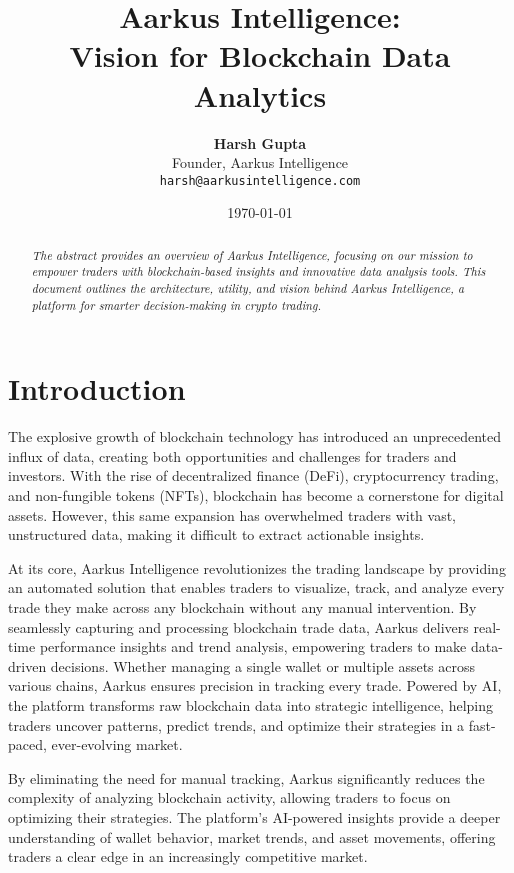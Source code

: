 \documentclass{article}
\title{\Huge \textbf{Aarkus Intelligence: \\ Vision for Blockchain Data Analytics}}
\author{
  \textbf{Harsh Gupta} \\
  Founder, Aarkus Intelligence \\
  \texttt{harsh@aarkusintelligence.com}
}
\date{\today}
\begin{document}
\maketitle
\thispagestyle{empty} %

\begin{abstract}
\textit{
The abstract provides an overview of Aarkus Intelligence, focusing on our mission to empower traders with blockchain-based insights and innovative data analysis tools. This document outlines the architecture, utility, and vision behind Aarkus Intelligence, a platform for smarter decision-making in crypto trading.
}
\end{abstract}

\tableofcontents

\newpage
\section{Introduction}
The explosive growth of blockchain technology has introduced an unprecedented influx of data, creating both opportunities and challenges for traders and investors. With the rise of decentralized finance (DeFi), cryptocurrency trading, and non-fungible tokens (NFTs), blockchain has become a cornerstone for digital assets. However, this same expansion has overwhelmed traders with vast, unstructured data, making it difficult to extract actionable insights.

At its core, Aarkus Intelligence revolutionizes the trading landscape by providing an automated solution that enables traders to visualize, track, and analyze every trade they make across any blockchain without any manual intervention. By seamlessly capturing and processing blockchain trade data, Aarkus delivers real-time performance insights and trend analysis, empowering traders to make data-driven decisions. Whether managing a single wallet or multiple assets across various chains, Aarkus ensures precision in tracking every trade. Powered by AI, the platform transforms raw blockchain data into strategic intelligence, helping traders uncover patterns, predict trends, and optimize their strategies in a fast-paced, ever-evolving market.

By eliminating the need for manual tracking, Aarkus significantly reduces the complexity of analyzing blockchain activity, allowing traders to focus on optimizing their strategies. The platform’s AI-powered insights provide a deeper understanding of wallet behavior, market trends, and asset movements, offering traders a clear edge in an increasingly competitive market.
\end{document}
